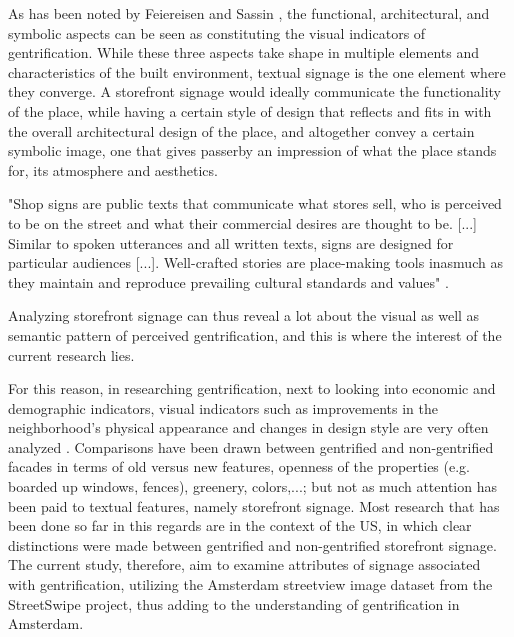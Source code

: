 As has been noted by Feiereisen and Sassin \cite{feiereisen2021}, the functional, architectural, and symbolic aspects can be seen as constituting the visual indicators of gentrification. While these three aspects take shape in multiple elements and characteristics of the built environment, textual signage is the one element where they converge. A storefront signage would ideally communicate the functionality of the place, while having a certain style of design that reflects and fits in with the overall architectural design of the place, and altogether convey a certain symbolic image, one that gives passerby an impression of what the place stands for, its atmosphere and aesthetics. 

\begin{displayquote}
    "Shop signs are public texts that communicate what stores sell, who is perceived to be on the street and what their commercial desires are thought to be. [...] Similar to spoken utterances and all written texts, signs are designed for particular audiences [...]. Well-crafted stories are place-making tools inasmuch as they maintain and reproduce prevailing cultural standards and values" \cite{trinch_signsays_2017}. 
\end{displayquote}

Analyzing storefront signage can thus reveal a lot about the visual as well as semantic pattern of perceived gentrification, and this is where the interest of the current research lies.

For this reason, in researching gentrification, next to looking into economic and demographic indicators, visual indicators such as improvements in the neighborhood's physical appearance and changes in design style are very often analyzed \cite{huang2022, ravuri2022, naik2017, ilic2019}. Comparisons have been drawn between gentrified and non-gentrified facades in terms of old versus new features, openness of the properties (e.g. boarded up windows, fences), greenery, colors,...; but not as much attention has been paid to textual features, namely storefront signage. Most research that has been done so far in this regards are in the context of the US, in which clear distinctions were made between gentrified and non-gentrified storefront signage. The current study, therefore, aim to examine attributes of signage associated with gentrification, utilizing the Amsterdam streetview image dataset from the StreetSwipe project, thus adding to the understanding of gentrification in Amsterdam.

